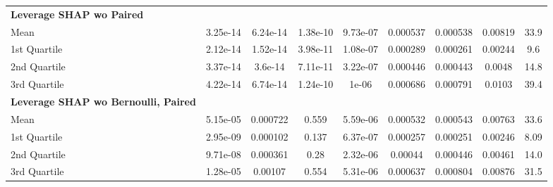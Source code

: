 {\begin{tabular} {lcccccccc}
\addlinespace[1ex] 
\textbf{Leverage SHAP wo Paired} &  &  &  &  &  &  &  &  \\ 
\hspace{7pt}Mean & \cellcolor{gold!60}3.25e-14 & \cellcolor{silver!60}6.24e-14 & \cellcolor{silver!60}1.38e-10 & 9.73e-07 & 0.000537 & 0.000538 & 0.00819 & 33.9 \\ 
\hspace{7pt}1st Quartile & \cellcolor{gold!60}2.12e-14 & \cellcolor{silver!60}1.52e-14 & \cellcolor{gold!60}3.98e-11 & 1.08e-07 & 0.000289 & 0.000261 & 0.00244 & 9.6 \\ 
\hspace{7pt}2nd Quartile & \cellcolor{gold!60}3.37e-14 & \cellcolor{bronze!60}3.6e-14 & \cellcolor{gold!60}7.11e-11 & 3.22e-07 & 0.000446 & 0.000443 & 0.0048 & 14.8 \\ 
\hspace{7pt}3rd Quartile & \cellcolor{silver!60}4.22e-14 & \cellcolor{bronze!60}6.74e-14 & \cellcolor{bronze!60}1.24e-10 & 1e-06 & 0.000686 & 0.000791 & 0.0103 & 39.4 \\ 
\addlinespace[1ex] 
\textbf{Leverage SHAP wo Bernoulli, Paired} &  &  &  &  &  &  &  &  \\ 
\hspace{7pt}Mean & 5.15e-05 & 0.000722 & 0.559 & 5.59e-06 & 0.000532 & 0.000543 & 0.00763 & 33.6 \\ 
\hspace{7pt}1st Quartile & 2.95e-09 & 0.000102 & 0.137 & 6.37e-07 & 0.000257 & 0.000251 & 0.00246 & 8.09 \\ 
\hspace{7pt}2nd Quartile & 9.71e-08 & 0.000361 & 0.28 & 2.32e-06 & 0.00044 & 0.000446 & 0.00461 & 14.0 \\ 
\hspace{7pt}3rd Quartile & 1.28e-05 & 0.00107 & 0.554 & 5.31e-06 & 0.000637 & 0.000804 & 0.00876 & 31.5 \\ 
\bottomrule
\end{tabular}}
